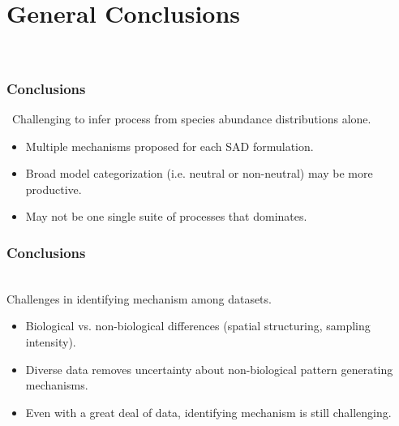 \documentclass[14pt]{beamer}
\begin{document}
\section{General Conclusions}
\begin{frame}{}
~\\ 
\frametitle{Conclusions}\
Challenging to infer process from species abundance distributions alone.
~\\ 
\begin{itemize}
\item Multiple mechanisms proposed for each SAD formulation.
\item Broad model categorization (i.e. neutral or non-neutral) may be more productive.
\item May not be one single suite of processes that dominates.
\end{itemize} 
\end{frame}

\begin{frame}[t]{}
\frametitle{Conclusions}\
~\\ 
Challenges in identifying mechanism among datasets.
~\\ 
\begin{itemize}
\item Biological vs. non-biological differences (spatial structuring, sampling intensity).
\item Diverse data removes uncertainty about non-biological pattern generating mechanisms.
\item Even with a great deal of data, identifying mechanism is still challenging.
\end{itemize} 
\end{frame}

\end{document}
